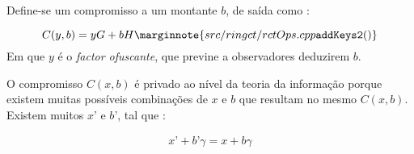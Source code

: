 

Define-se um compromisso a um montante $b$, de saída como :

\vspace{.175cm}
\[C(y,b) = y G + b H\marginnote{src/ringct/ rctOps.cpp {\tt addKeys2()}}\]
\vspace{.175cm}
\newline
Em que $y$ é o {\em factor ofuscante}, que previne a observadores deduzirem $b$.


O compromisso $C(x, b)$ é privado ao nível da teoria da informação porque existem muitas possíveis combinações de $x$ e $b$ que resultam no mesmo $C(x, b)$.\newline
Existem muitos $x’$ e $b’$, tal que :

\begin{align*}
x’ + b’ \gamma = x + b \gamma
\end{align*}

